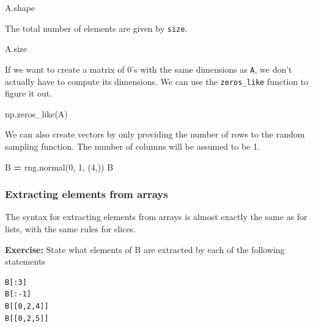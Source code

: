 \documentclass[
  letterpaper,
]{scrbook}
\newenvironment{Shaded}{\begin{snugshade}}{\end{snugshade}}
\newcommand{\DecValTok}[1]{\textcolor[rgb]{0.00,0.00,0.81}{#1}}
\newcommand{\NormalTok}[1]{#1}
\newcommand{\OperatorTok}[1]{\textcolor[rgb]{0.81,0.36,0.00}{\textbf{#1}}}
\begin{document}
\begin{Shaded}
\begin{Highlighting}[]
\NormalTok{A.shape}
\end{Highlighting}
\end{Shaded}

The total number of elements are given by \texttt{size}.

\begin{Shaded}
\begin{Highlighting}[]
\NormalTok{A.size}
\end{Highlighting}
\end{Shaded}

If we want to create a matrix of 0's with the same dimensions as \texttt{A}, we don't actually have to compute its dimensions. We can use the \texttt{zeros\_like} function to figure it out.

\begin{Shaded}
\begin{Highlighting}[]
\NormalTok{np.zeros\_like(A)}
\end{Highlighting}
\end{Shaded}

We can also create vectors by only providing the number of rows to the random sampling function. The number of columns will be assumed to be 1.

\begin{Shaded}
\begin{Highlighting}[]
\NormalTok{B }\OperatorTok{=}\NormalTok{ rng.normal(}\DecValTok{0}\NormalTok{, }\DecValTok{1}\NormalTok{, (}\DecValTok{4}\NormalTok{,))}
\NormalTok{B}
\end{Highlighting}
\end{Shaded}

\hypertarget{extracting-elements-from-arrays}{%
\subsubsection{Extracting elements from arrays}\label{extracting-elements-from-arrays}}

The syntax for extracting elements from arrays is almost exactly the same as for lists, with the same rules for slices.

\textbf{Exercise:} State what elements of B are extracted by each of the following statements

\begin{verbatim}
B[:3]
B[:-1]
B[[0,2,4]]
B[[0,2,5]]
\end{verbatim}
\end{document}
